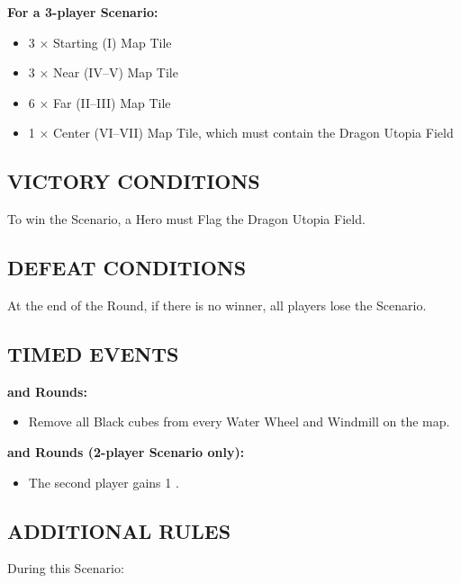 \begin{multicols*}{2}
\textbf{For a 3-player Scenario:}
\begin{itemize}
  \item 3 × Starting (I) Map Tile
  \item 3 × Near (IV--V) Map Tile
  \item 6 × Far (II--III) Map Tile
  \item 1 × Center (VI--VII) Map Tile, which must contain the Dragon Utopia Field
\end{itemize}

\subsection*{\MakeUppercase{Victory Conditions}}
To win the Scenario, a Hero must Flag the Dragon Utopia Field.

\subsection*{\MakeUppercase{Defeat Conditions}}
At the end of the  Round, if there is no winner, all players lose the Scenario.

\subsection*{\MakeUppercase{Timed Events}}

\textbf{ and  Rounds:}
\begin{itemize}
  \item Remove all Black cubes from every Water Wheel and Windmill on the map.
\end{itemize}

\textbf{ and  Rounds (2-player Scenario only):}
\begin{itemize}
  \item The second player gains 1 .
\end{itemize}

\subsection*{\MakeUppercase{Additional Rules}}

During this Scenario:


\end{multicols*}
